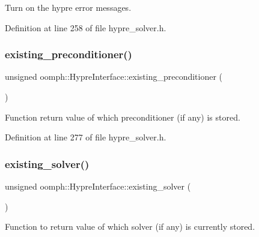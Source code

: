 Turn on the hypre error messages. 



Definition at line 258 of file hypre\+\_\+solver.\+h.

\mbox{\label{classoomph_1_1HypreInterface_a49751f00702cd3176ee61c4b226424eb}} 
\subsubsection{\texorpdfstring{existing\+\_\+preconditioner()}{existing\_preconditioner()}}
{\footnotesize\ttfamily unsigned oomph\+::\+Hypre\+Interface\+::existing\+\_\+preconditioner (\begin{DoxyParamCaption}{ }\end{DoxyParamCaption})\hspace{0.3cm}{\ttfamily [inline]}}



Function return value of which preconditioner (if any) is stored. 



Definition at line 277 of file hypre\+\_\+solver.\+h.

\mbox{\label{classoomph_1_1HypreInterface_a976554ee58a357435c047f78a1539434}} 
\subsubsection{\texorpdfstring{existing\+\_\+solver()}{existing\_solver()}}
{\footnotesize\ttfamily unsigned oomph\+::\+Hypre\+Interface\+::existing\+\_\+solver (\begin{DoxyParamCaption}{ }\end{DoxyParamCaption})\hspace{0.3cm}{\ttfamily [inline]}}



Function to return value of which solver (if any) is currently stored. 




